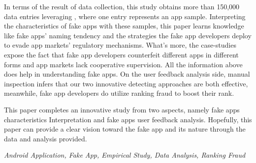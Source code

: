 In terms of the result of data collection, this study obtains more than 150,000 data entries leveraging \mytool, where one entry represents an app sample.
Interpreting the characteristics of fake apps with these samples, this paper learns knowledge like fake apps' naming tendency and the strategies the fake app developers deploy to evade app markets' regulatory mechanisms.
What's more, the case-studies expose the fact that fake app developers counterfeit different apps in different forms and app markets lack cooperative supervision.
All the information above does help in understanding fake apps.
On the user feedback analysis side, manual inspection infers that our two innovative detecting approaches are both effective, meanwhile, fake app developers do utilize ranking fraud to boost their rank.

This paper completes an innovative study from two aspects, namely fake apps characteristics Interpretation and fake apps user feedback analysis.
Hopefully, this paper can provide a clear vision toward the fake app and its nature through the data and analysis provided.

{} \textit{Android Application, Fake App, Empirical Study, Data Analysis, Ranking Fraud}
